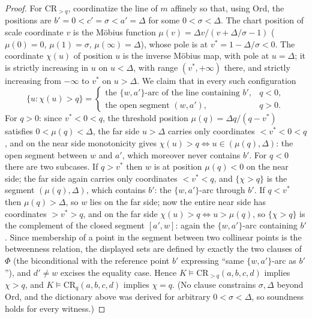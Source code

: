 \documentclass[11pt]{amsart}
\theoremstyle{definition}
\begin{document}
\begin{proof}
For $\mathrm{CR}_{>q}$, coordinatize the line of $m$ affinely so that, using
$\mathrm{Ord}$, the positions are $b'=0<c'=\sigma<a'=\Delta$ for some
$0<\sigma<\Delta$. The chart position of scale coordinate $v$ is the
M\"obius function $\mu(v)=\Delta v/(v+\Delta/\sigma-1)$
\textup($\mu(0)=0$, $\mu(1)=\sigma$, $\mu(\infty)=\Delta$\textup), whose pole
is at $v^{*}=1-\Delta/\sigma<0$. The coordinate $\chi(u)$ of position $u$ is
the inverse M\"obius map, with pole at $u=\Delta$; it is strictly increasing
in $u$ on $u<\Delta$, with range $(v^*,+\infty)$ there, and strictly
increasing from $-\infty$ to $v^{*}$ on $u>\Delta$. We claim that in every
such configuration
\[
\{u:\chi(u)>q\}=
\begin{cases}
\text{the }\{w,a'\}\text{-arc of the line containing }b', & q<0,\\
\text{the open segment }(w,a'), & q>0 .
\end{cases}
\]
For $q>0$: since $v^{*}<0<q$, the threshold position
$\mu(q)=\Delta q/(q-v^{*})$ satisfies $0<\mu(q)<\Delta$, the far side
$u>\Delta$ carries only coordinates $<v^{*}<0<q$, and on the near side
monotonicity gives $\chi(u)>q\iff u\in(\mu(q),\Delta)$: the open segment
between $w$ and $a'$, which moreover never contains $b'$. For $q<0$ there are
two subcases. If $q>v^{*}$ then $w$ is at position $\mu(q)<0$ on the near
side; the far side again carries only coordinates $<v^{*}<q$, and
$\{\chi>q\}$ is the segment $(\mu(q),\Delta)$, which contains $b'$: the
$\{w,a'\}$-arc through $b'$. If $q<v^{*}$ then $\mu(q)>\Delta$, so $w$ lies
on the far side; now the entire near side has coordinates $>v^{*}>q$, and on
the far side $\chi(u)>q\iff u>\mu(q)$, so $\{\chi>q\}$ is the complement of
the closed segment $[a',w]$: again the $\{w,a'\}$-arc containing $b'$. Since
membership of a point in the segment between two collinear points is the
betweenness relation, the displayed sets are defined by exactly the two
clauses of $\Phi$ \textup(the biconditional with the reference point $b'$
expressing ``same $\{w,a'\}$-arc as $b'$''\textup), and $d'\ne w$ excises the
equality case. Hence $K\models\mathrm{CR}_{>q}(a,b,c,d)$ implies $\chi>q$,
and $K\models\mathrm{CR}_q(a,b,c,d)$ implies $\chi=q$. \textup(No clause
constrains $\sigma,\Delta$ beyond $\mathrm{Ord}$, and the dictionary above
was derived for arbitrary $0<\sigma<\Delta$, so soundness holds for every
witness.\textup)


\end{proof}
\end{document}
